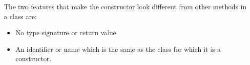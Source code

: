 The two features that make the constructor look different from other
methods in a class are:
\begin{itemize}
	\item No type signature or return value
	\item An identifier or name which is the same as the class for
		which it is a constructor.
\end{itemize}
